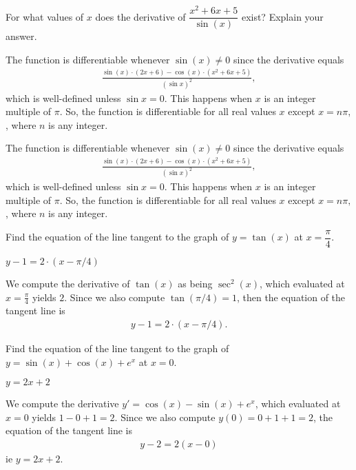 \begin{question}[test]
For what values of $x$ does the derivative of
$\dfrac{x^2+6x+5}{\sin(x)}$ exist? Explain your answer.
\end{question}
\begin{answer}
The function is differentiable whenever $\sin(x)\ne 0$ since the derivative equals
\begin{align*}
\frac{\sin(x)\cdot (2x+6) - \cos(x)\cdot (x^2+6x+5)}{(\sin x)^2},
\end{align*}
which is well-defined unless $\sin x = 0$. This happens when $x$ is an integer multiple
of $\pi$. So, the function is differentiable for all real values $x$ except $x=n\pi,$, where $n$ is any integer.
\end{answer}
\begin{solution}
The function is differentiable whenever $\sin(x)\ne 0$ since the derivative equals
\begin{align*}
\frac{\sin(x)\cdot (2x+6) - \cos(x)\cdot (x^2+6x+5)}{(\sin x)^2},
\end{align*}
which is well-defined unless $\sin x = 0$. This happens when $x$ is an integer multiple
of $\pi$. So, the function is differentiable for all real values $x$ except $x=n\pi,$, where $n$ is any integer.
\end{solution}


\begin{question}[2015Q]
 Find the equation of the line tangent to the graph of $y=\tan(x)$ at
$x=\dfrac{\pi}{4}$.
\end{question}
\begin{answer}
$y -  1 = 2\cdot (x-\pi/4)$
\end{answer}
\begin{solution}
We compute the derivative of $\tan(x)$ as being $\sec^2(x)$, which evaluated at
$x=\frac{\pi}{4}$ yields $2$. Since we also compute
$\tan(\pi/4)=1$, then the equation of the tangent line is
\begin{align*}
y -  1 = 2\cdot (x-\pi/4).
\end{align*}
\end{solution}


\begin{question}[2015Q]
Find the equation of the line tangent to the graph of $y=\sin(x)+\cos(x)+e^x$
at
$x=0$.
\end{question}
\begin{answer} $y=2x+2$
\end{answer}
\begin{solution}
We compute the derivative $y' = \cos(x)-\sin(x)+e^x$, which evaluated at
$x=0$ yields $1-0+1 = 2$. Since we also compute $y(0)=0+1+1=2$, the equation of the
tangent line is
\begin{align*}
y -  2 = 2(x-0)
\end{align*}
ie $y=2x+2$.
\end{solution}


